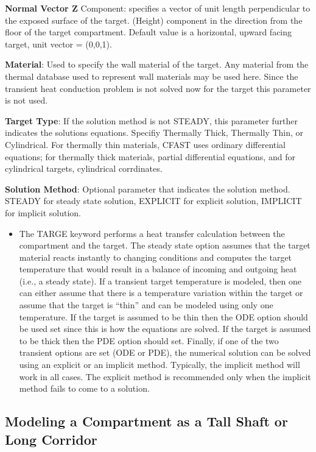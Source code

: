 \textbf{Normal Vector Z} Component: specifies a vector of unit length perpendicular to the exposed surface of the target. (Height) component in the direction from the floor of the target compartment. Default value is a horizontal, upward facing target, unit vector = (0,0,1).

\textbf{Material}: Used to specify the wall material of the target.  Any material from the thermal database used to represent wall materials may be used here.  Since the transient heat conduction problem is not solved now for the target this parameter is not used. 

\textbf{Target Type}: If the solution method is not STEADY, this parameter further indicates the solutions equations.  Specifiy Thermally Thick, Thermally Thin, or Cylindrical.  For thermally thin materials, CFAST uses ordinary differential equations; for thermally thick materials, partial differential equations, and for cylindrical targets, cylindrical corrdinates.

\textbf{Solution Method}: Optional parameter that indicates the solution method. STEADY for steady state solution, EXPLICIT for explicit solution, IMPLICIT for implicit solution.

\begin{itemize}

\item The TARGE keyword performs a heat transfer calculation between the compartment and the target. The steady state option assumes that the target material reacts instantly to changing conditions and computes the target temperature that would result in a balance of incoming and outgoing heat (i.e., a steady state). If a transient target temperature is modeled, then one can either assume that there is a temperature variation within the target or assume that the target is “thin” and can be modeled using only one temperature. If the target is assumed to be thin then the ODE option should be used set since this is how the equations are solved. If the target is assumed to be thick then the PDE option should set. Finally, if one of the two transient options are set (ODE or PDE), the numerical solution can be solved using an explicit or an implicit method.  Typically, the implicit method will work in all cases.  The explicit method is recommended only when the implicit method fails to come to a solution.

\end{itemize}

\subsection{Modeling a Compartment as a Tall Shaft or Long Corridor}

